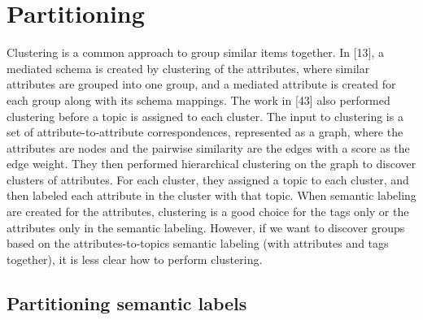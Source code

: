 \section{Partitioning}
\label{sec:Partitioning}

Clustering is a common approach to group similar items together. In [13], a mediated schema is created by clustering of the attributes, where similar attributes are grouped into one group, and a mediated attribute is created for each group along with its schema mappings. The work in [43] also performed clustering before a topic is assigned to each cluster. The input to clustering is a set of attribute-to-attribute correspondences, represented as a graph, where the attributes are nodes and the pairwise similarity are the edges with a score as the edge weight. They then performed hierarchical clustering on the graph to discover clusters of attributes. For each cluster, they assigned a topic to each cluster, and then labeled each attribute in the cluster with that topic.
When semantic labeling are created for the attributes, clustering is a good choice for the tags only or the attributes only in the semantic labeling. However, if we want to discover groups based on the attributes-to-topics semantic labeling (with attributes and tags together), it is less clear how to perform clustering.

\subsection{Partitioning semantic labels}
\label{ssec:PartitioningSemanticLabels}

